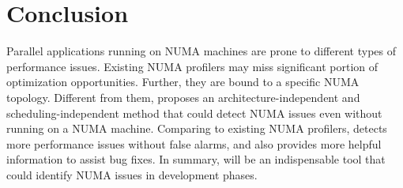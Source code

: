 \section{Conclusion}
\label{sec:conclusion}

Parallel applications running on NUMA machines are prone to different types of performance issues. Existing NUMA profilers may miss significant portion of optimization opportunities. Further, they are bound to a specific NUMA topology. Different from them, \NP{} proposes an architecture-independent  and scheduling-independent method that could detect NUMA issues even without running on a NUMA machine. Comparing to existing NUMA profilers, \NP{} detects more performance issues without false alarms, and also provides more helpful information to assist bug fixes. In summary, \NP{} will be an indispensable tool that could identify NUMA issues in development phases. 

